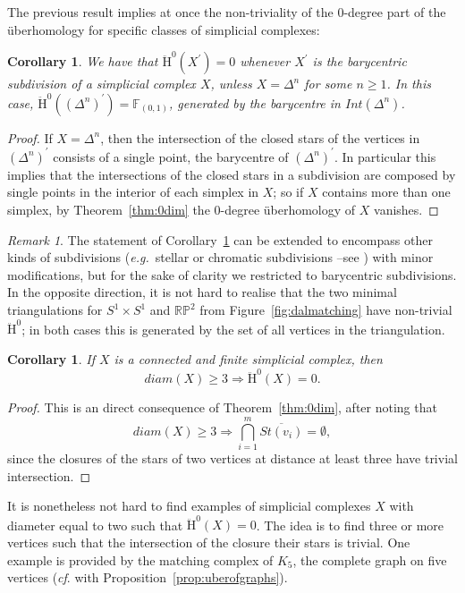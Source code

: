 \documentclass[11pt, a4paper, reqno, twoside, makeidx]{amsart}
\theoremstyle{remark}
\newtheorem{rmk}{Remark}[section]
\theoremstyle{plain}
\newtheorem{cor}[thm]{Corollary}
\theoremstyle{definition}
\newcommand{\R}{\mathbb{R}}
\newcommand{\F}{\mathbb{F}}
\newcommand{\uH}{\ddot{\mathrm{H}}}
\begin{document}
The previous result implies at once the non-triviality of the $0$-degree part of the \"uberhomology for specific classes of simplicial complexes: 
\begin{cor}\label{cor:subdivisiondegree0}
We have that $\uH^0(X^\prime) = 0$ whenever $X^\prime$ is the barycentric subdivision of a simplicial complex $X$, unless $X = \Delta^n$ for some $n\ge 1$. In this case, $\uH^0((\Delta^n)^\prime) = \F_{(0,1)}$, generated by the barycentre in $Int(\Delta^n)$.
\end{cor}
\begin{proof}
If $X = \Delta^n$, then the intersection of the closed stars of the vertices in $(\Delta^n)^\prime$ consists of a single point, the barycentre of $(\Delta^n)^\prime$. In particular this implies that the intersections of the closed stars in a subdivision are composed by single points in the interior of each simplex in $X$; so if $X$ contains more than one simplex, by Theorem~\ref{thm:0dim} the $0$-degree \"uberhomology of $X$ vanishes. 
\end{proof}
\begin{rmk}\label{rmk:othersubdivisions}
The statement of Corollary~\ref{cor:subdivisiondegree0} can be extended to encompass other kinds of subdivisions (\emph{e.g.}~stellar or chromatic subdivisions --see \cite{kozlov2012chromatic}) with minor modifications, but for the sake of clarity we restricted to barycentric subdivisions. In the opposite direction, it is not hard to realise that the two minimal triangulations for $S^1\times S^1$ and $\R\mathbb{P}^2$ from Figure~\ref{fig:dalmatching} have non-trivial $\uH^0$; in both cases this is generated by the set of all vertices in the triangulation.
\end{rmk}


\begin{cor}\label{cor:diameter}
If $X$ is a connected and finite simplicial complex, then  $$ diam(X) \ge 3 \Longrightarrow \uH^0(X) = 0. $$
\end{cor}
\begin{proof}
This is an direct consequence of Theorem~\ref{thm:0dim}, after noting that $$diam(X) \ge 3 \Longrightarrow \bigcap_{i=1}^m \overline{St(v_i)} = \emptyset,$$ since the closures of the stars of two vertices at distance at least three have trivial intersection.
\end{proof}

It is nonetheless not hard to find examples of simplicial complexes $X$ with diameter equal to two such that $\uH^0(X) = 0$. The idea is to find three or more vertices such that the intersection of the closure their stars is trivial. One example is provided by the matching complex of $K_5$, the complete graph on five vertices (\emph{cf}. with Proposition~\ref{prop:uberofgraphs}).\\
\end{document}
